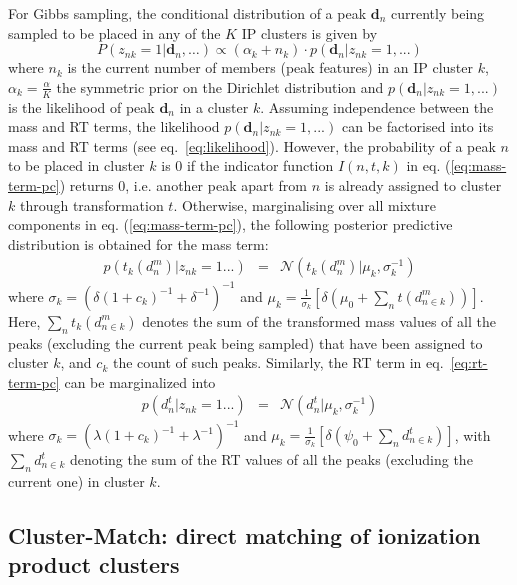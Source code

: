 For Gibbs sampling, the conditional distribution of a peak $\boldsymbol{d}_{n}$ currently being sampled to be placed in any of the $K$ IP clusters is given by
\begin{equation}
P(z_{nk}=1|\boldsymbol{d}_{n},\ldots)\propto(\alpha_{k}+n_{k})\cdot p(\mathbf{d}_{n}|z_{nk}=1,...)\label{eq:finite_conditional}
\end{equation}
where $n_{k}$ is the current number of members (peak features) in an IP cluster $k$, $\alpha_{k}=\frac{\alpha}{K}$ the symmetric prior on the Dirichlet distribution and $p(\mathbf{d}_{n}|z_{nk}=1,...)$ is the likelihood of peak $\mathbf{d}_{n}$ in a cluster $k$. Assuming independence between the mass and RT terms, the likelihood $p(\mathbf{d}_{n}|z_{nk}=1,...)$ can be factorised into its mass and RT terms (see eq.~\ref{eq:likelihood}). However, the probability of a peak $n$ to be placed in cluster $k$ is 0 if the indicator function $I(n,t, k)$ in eq. (\ref{eq:mass-term-pc}) returns 0, i.e. another peak apart from $n$ is already assigned to cluster $k$ through transformation $t$. Otherwise, marginalising over all mixture components in eq. (\ref{eq:mass-term-pc}), the following posterior predictive distribution is obtained for the mass term: 
\begin{eqnarray}
p(t_{k}(d_{n}^{m})|z_{nk}=1...) & = & \mathcal{N}(t_{k}(d_{n}^{m})|\mu_{k},\sigma_{k}^{-1})\label{eq:mass-term}
\end{eqnarray}
where $\sigma_{k}=(\delta(1+c_{k})^{-1}+\delta^{-1})^{-1}$ and $\mu_{k}=\frac{1}{\sigma_{k}}\left[\delta(\mu_{0}+\sum_{n}t(d_{n\in k}^{m}))\right]$.
Here, $\sum_{n}t_{k}(d_{n\in k}^{m})$ denotes the sum of the transformed mass values of all the peaks (excluding the current peak being sampled) that have been assigned to cluster $k$, and $c_{k}$ the count of such peaks. Similarly, the RT term in eq.~\ref{eq:rt-term-pc} can be marginalized into
\begin{eqnarray}
p(d_{n}^{t}|z_{nk}=1...) & = & \mathcal{N}(d_{n}^{t}|\mu_{k},\sigma_{k}^{-1})\label{eq:rt-term}
\end{eqnarray}
where $\sigma_{k}=(\lambda(1+c_{k})^{-1}+\lambda^{-1})^{-1}$ and $\mu_{k}=\frac{1}{\sigma_{k}}\left[\delta(\psi_{0}+\sum_{n}d_{n\in k}^{t})\right]$, with $\sum_{n}d_{n\in k}^{t}$ denoting the sum of the RT values of all the peaks (excluding the current one) in cluster $k$.

\subsection{Cluster-Match: direct matching of ionization product clusters\label{sub:cluster-match}}

